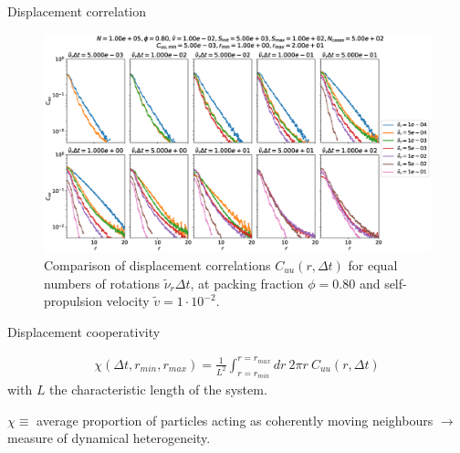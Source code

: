 \documentclass{beamer}
\begin{document}
\begin{frame}{Displacement correlation}

\begin{figure}[h!]
  \centering
  \includegraphics[width=\linewidth]{Cuu_comparison_Dk8000_Vj1000_Nq1000_Cn5000_LINLOG.eps}
  \caption{Comparison of displacement correlations $C_{uu}(r, \Delta t)$ for equal numbers of rotations $\tilde{\nu}_r\Delta t$, at packing fraction $\phi=0.80$ and self-propulsion velocity $\tilde{v}=1\cdot10^{-2}$.}
\end{figure}

\end{frame}

\begin{frame}{Displacement cooperativity}


\begin{align*}
\chi(\Delta t, r_{min}, r_{max}) = \frac{1}{L^2} \int_{r=r_{min}}^{r=r_{max}}  dr~ 2\pi r~ C_{uu}(r, \Delta t)
\end{align*}
with $L$ the characteristic length of the system.\\

\begin{definition}
$\chi \equiv$ average proportion of particles acting as coherently moving neighbours $\rightarrow$ measure of dynamical heterogeneity.
\end{definition}

\end{frame}
\end{document}

